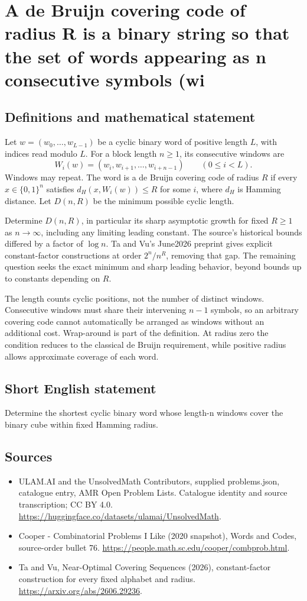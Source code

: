\documentclass[11pt,a4paper]{article}
\begin{document}
\section*{A de Bruijn covering code of radius R is a binary string so that the set of words appearing as n consecutive symbols (wi}\label{statement}

\subsection{Definitions and mathematical statement}
Let $w=(w_0,\ldots,w_{L-1})$ be a cyclic binary word of positive
length $L$, with indices read modulo $L$. For a block length
$n\ge1$, its consecutive windows are
\[
           W_i(w)=(w_i,w_{i+1},\ldots,w_{i+n-1})
                              \qquad(0\le i<L).
\]
Windows may repeat. The word is a de Bruijn covering code of
radius $R$ if every $x\in\{0,1\}^n$ satisfies
$d_H(x,W_i(w))\le R$ for some $i$, where $d_H$ is Hamming
distance. Let $D(n,R)$ be the minimum possible cyclic length.

Determine $D(n,R)$, in particular its sharp asymptotic growth
for fixed $R\ge1$ as $n\to\infty$, including any limiting leading
constant. The source's historical bounds differed by a factor
of $\log n$. Ta and Vu's June2026 preprint gives explicit
constant-factor constructions at order $2^n/n^R$, removing
that gap. The remaining question seeks the exact minimum and
sharp leading behavior, beyond bounds up to constants depending
on $R$.

The length counts cyclic positions, not the number of distinct
windows. Consecutive windows must share their intervening
$n-1$ symbols, so an arbitrary covering code cannot automatically
be arranged as windows without an additional cost. Wrap-around
is part of the definition. At radius zero the condition reduces
to the classical de Bruijn requirement, while positive radius
allows approximate coverage of each word.
\subsection{Short English statement}
Determine the shortest cyclic binary word whose length-n windows cover the binary cube within fixed Hamming radius.
\subsection{Sources}
\begin{itemize}
\item[S1] ULAM.AI and the UnsolvedMath Contributors, supplied problems.json, catalogue entry, AMR Open Problem Lists. Catalogue identity and source transcription; CC BY 4.0.
\url{https://huggingface.co/datasets/ulamai/UnsolvedMath}.
\item[S2] Cooper - Combinatorial Problems I Like (2020 snapshot), Words and Codes, source-order bullet 76. 
\url{https://people.math.sc.edu/cooper/combprob.html}.
\item[S3] Ta and Vu, Near-Optimal Covering Sequences (2026), constant-factor construction for every fixed alphabet and radius.
\url{https://arxiv.org/abs/2606.29236}.
\end{itemize}
\end{document}
